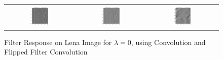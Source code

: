 \documentclass[a4paper]{article}
\begin{document}
\begin{figure}[!ht]
\centering
\begin{tabular}{ccc}
{\includegraphics[width=0.3\textwidth]{corr-filters/g0_conv_non}} &
{\includegraphics[width=0.3\textwidth]{corr-filters/g0_conv}} &
{\includegraphics[width=0.3\textwidth]{corr-filters/g0_conv_zoom}}
\end{tabular}
\caption{Filter Response on Lena Image for $\lambda=0$, using Convolution and Flipped Filter Convolution}
\end{figure}
\end{document}
